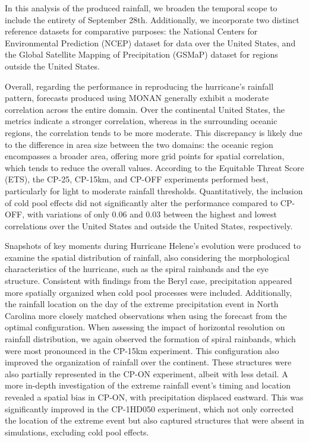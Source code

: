 In this analysis of the produced rainfall, we broaden the temporal scope to include the entirety of September 28th. Additionally, we incorporate two distinct reference datasets for comparative purposes: the National Centers for Environmental Prediction (NCEP) dataset for data over the United States, and the Global Satellite Mapping of Precipitation (GSMaP) dataset for regions outside the United States.

Overall, regarding the performance in reproducing the hurricane’s rainfall pattern, forecasts produced using MONAN generally exhibit a moderate correlation across the entire domain. Over the continental United States, the metrics indicate a stronger correlation, whereas in the surrounding oceanic regions, the correlation tends to be more moderate. This discrepancy is likely due to the difference in area size between the two domains: the oceanic region encompasses a broader area, offering more grid points for spatial correlation, which tends to reduce the overall values. According to the Equitable Threat Score (ETS), the CP-25, CP-15km, and CP-OFF experiments performed best, particularly for light to moderate rainfall thresholds. Quantitatively, the inclusion of cold pool effects did not significantly alter the performance compared to CP-OFF, with variations of only 0.06 and 0.03 between the highest and lowest correlations over the United States and outside the United States, respectively.

Snapshots of key moments during Hurricane Helene’s evolution were produced to examine the spatial distribution of rainfall, also considering the morphological characteristics of the hurricane, such as the spiral rainbands and the eye structure. Consistent with findings from the Beryl case, precipitation appeared more spatially organized when cold pool processes were included. Additionally, the rainfall location on the day of the extreme precipitation event in North Carolina more closely matched observations when using the forecast from the optimal configuration.
When assessing the impact of horizontal resolution on rainfall distribution, we again observed the formation of spiral rainbands, which were most pronounced in the CP-15km experiment. This configuration also improved the organization of rainfall over the continent. These structures were also partially represented in the CP-ON experiment, albeit with less detail. A more in-depth investigation of the extreme rainfall event’s timing and location revealed a spatial bias in CP-ON, with precipitation displaced eastward. This was significantly improved in the CP-1HD050 experiment, which not only corrected the location of the extreme event but also captured structures that were absent in simulations, excluding cold pool effects.


